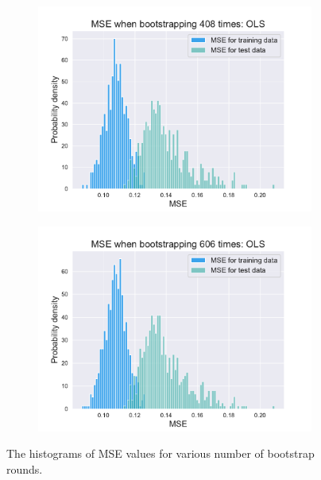 \documentclass[twocolumn,english,notitlepage]{article}
\begin{document}
\begin{appendices}
\begin{figure}
\begin{subfigure}{.5\textwidth}
                \caption{}
                \label{app:fig:histograms_for_rounds:102}
            \end{subfigure}
            \hfill
            \begin{subfigure}{.5\textwidth}
                \centering
                \includegraphics[width=.9\linewidth]{BS_hist_bootstraped_408_rounds_of_degree_7.pdf}
                \caption{}
                \label{app:fig:histograms_for_rounds:408}
            \end{subfigure}
            \begin{subfigure}{.5\textwidth}
                \centering
                \includegraphics[width=.9\linewidth]{BS_hist_bootstraped_606_rounds_of_degree_7.pdf}
                \caption{}
                \label{app:fig:histograms_for_rounds:606}
            \end{subfigure}

            \caption{The histograms of MSE values for various number of bootstrap rounds. }
            \label{app:fig:histograms_for_rounds}
        \end{figure}

\end{appendices}

\printbibliography
\end{document}
